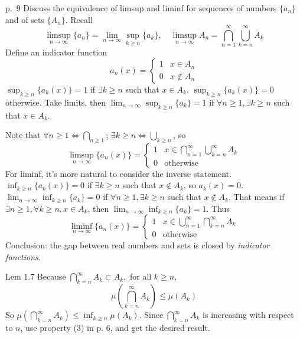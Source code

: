 \begin{note}{p.~9}
    Discuss the equivalence of limsup and liminf for sequences of numbers $\{a_n\}$ and of sets $\{A_n\}$. Recall
    \[
    \limsup_{n\to\infty}\{a_n\}=\lim_{n\to\infty}\sup_{k\ge n}\{a_k\},\quad \limsup_{n\to\infty}A_n=\bigcap_{n=1}^{\infty}\bigcup_{k=n}^{\infty}A_k
    \]
    Define an indicator function
    \[
    a_n(x)=\begin{cases}
        1 & x\in A_n\\
        0 & x\notin A_n
    \end{cases}
    \]
    $\sup_{k\ge n}\{a_k(x)\}=1$ if $\exists k\ge n$ such that $x\in A_k$. $\sup_{k\ge n}\{a_k(x)\}=0$ otherwise. Take limits, then $\lim_{n\to\infty}\sup_{k\ge n}\{a_k\}=1$ if $\forall n\ge 1,\exists k\ge n$ such that $x\in A_k$. 
    
    Note that $\forall n\ge 1\iff \bigcap_{n\ge 1}$; $\exists k\ge n\iff \bigcup_{k\ge n}$, so
    \[
    \limsup_{n\to\infty}\{a_n(x)\}=\begin{cases}
        1 & x\in \bigcap_{n=1}^{\infty}\bigcup_{k=n}^{\infty}A_k\\
        0 & \text{otherwise}
    \end{cases}
    \]
    For liminf, it's more natural to consider the inverse statement. $\inf_{k\ge n} \{a_k(x)\}=0$ if $\exists k\ge n$ such that $x\notin A_k$, so $a_k(x)=0$. $\lim_{n\to\infty}\inf_{k\ge n}\{a_k\}=0$ if $\forall n\ge 1,\exists k\ge n$ such that $x\notin A_k$. That means if $\exists n\ge 1,\forall k\ge n, x\in A_k$, then $\lim_{n\to\infty}\inf_{k\ge n}\{a_k\}=1$. Thus
    \[
    \liminf_{n\to\infty}\{a_n(x)\}=\begin{cases}
        1 & x\in \bigcup_{n=1}^{\infty}\bigcap_{k=n}^{\infty}A_k\\
        0 & \text{otherwise}
    \end{cases}
    \]
    Conclusion: the gap between real numbers and sets is closed by \emph{indicator functions}.
\end{note}

\begin{note}{Lem 1.7}
    Because $\bigcap_{k=n}^{\infty}A_k\subset A_k, $ for all $k\ge n$,
    \[
    \mu\left(\bigcap_{k=n}^{\infty}A_k\right)\le \mu(A_k)
    \]
    So $\mu\left(\bigcap_{k=n}^{\infty}A_k\right)\le \inf_{k\ge n}\mu(A_k)$. Since $\bigcap_{k=n}^{\infty}A_k$ is increasing with respect to $n$, use property (3) in p. 6, and get the desired result.
\end{note}

